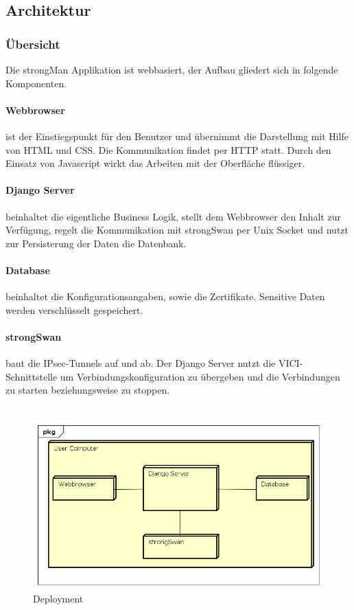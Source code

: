 \subsection{Architektur}

\subsubsection{Übersicht}
Die strongMan Applikation ist webbasiert, der Aufbau gliedert sich in folgende Komponenten.

\paragraph{Webbrowser} ist der Einstiegspunkt für den Benutzer und übernimmt die Darstellung mit Hilfe von HTML und CSS. Die Kommunikation findet per HTTP statt. Durch den Einsatz von Javascript wirkt das Arbeiten mit der Oberfläche flüssiger.

\paragraph{Django Server} beinhaltet die eigentliche Business Logik,  stellt dem Webbrowser den Inhalt zur Verfügung, regelt die Kommunikation mit strongSwan per Unix Socket und nutzt zur Persisterung der Daten die Datenbank.

\paragraph{Database} beinhaltet die Konfigurationsangaben, sowie die Zertifikate. Sensitive Daten werden verschlüsselt gespeichert.

\paragraph{strongSwan} baut die IPsec-Tunnels auf und ab. Der Django Server nutzt die VICI-Schnittstelle um Verbindungskonfiguration zu übergeben und die Verbindungen zu starten beziehungsweise zu stoppen. \\\\


\begin{figure}[H]
\centering
\includegraphics[width=360pt]{images/deployment.png}
\caption[Deployment]{Deployment}
\end{figure}

